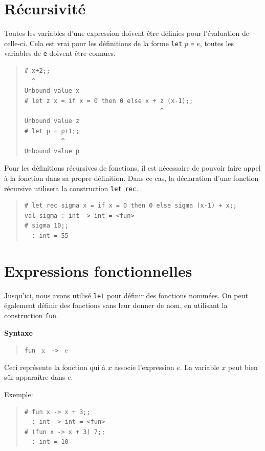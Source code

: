 \documentclass[11pt, a4paper]{article}
\begin{document}
\section{Récursivité}

Toutes les variables d'une expression doivent être définies pour
l'évaluation de celle-ci. Cela est vrai pour les définitions de la
forme \verb+let+ $p$ \verb+=+ $e$, toutes les variables de \verb+e+
doivent être connues.

\begin{quote}
\begin{verbatim}
# x+2;;
  ^
Unbound value x
# let z x = if x = 0 then 0 else x + z (x-1);;
                                     ^
Unbound value z
# let p = p+1;;
          ^
Unbound value p
\end{verbatim}
\end{quote}

Pour les définitions récursives de fonctions, il est nécessaire
de pouvoir faire appel à la fonction dans sa propre
définition. Dans ce cas, la déclaration d'une fonction récursive
utilisera la construction \verb+let rec+.

\begin{quote}
\begin{verbatim}
# let rec sigma x = if x = 0 then 0 else sigma (x-1) + x;;
val sigma : int -> int = <fun>
# sigma 10;;
- : int = 55
\end{verbatim}
\end{quote}

\section{Expressions fonctionnelles}

Jusqu'ici, nous avons utilisé {\tt let} pour définir des fonctions
nommées. On peut également définir des fonctions sans leur donner de
nom, en utilisant la construction {\tt fun}.

{\bf Syntaxe}
\begin{quote}
\verb+fun + x \verb+ -> + e
\end{quote}

Ceci représente la fonction qui à $x$ associe l'expression $e$. La
variable $x$ peut bien sûr apparaître dans $e$.

Exemple:
\begin{quote}
\begin{verbatim}
# fun x -> x + 3;;
- : int -> int = <fun>
# (fun x -> x + 3) 7;;
- : int = 10
\end{verbatim}
\end{quote}
\end{document}
